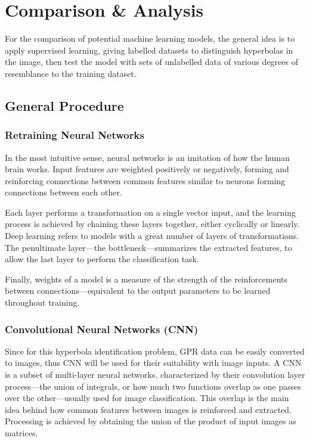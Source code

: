 \documentclass[se,blockletter]{uw-wkrpt}
\begin{document}
\section{Comparison \& Analysis}
For the comparison of potential machine learning models, the general idea is to apply supervised learning, giving labelled datasets to distinguish hyperbolas in the image, then test the model with sets of unlabelled data of various degrees of resemblance to the training dataset.

\subsection{General Procedure}
\subsubsection{Retraining Neural Networks}
In the most intuitive sense, neural networks is an imitation of how the human brain works. Input features are weighted positively or negatively, forming and reinforcing connections between common features similar to neurons forming connections between each other.

Each layer performs a transformation on a single vector input, and the learning process is achieved by chaining these layers together, either cyclically or linearly. Deep learning refers to models with a great number of layers of transformations. The penultimate layer---the bottleneck---summarizes the extracted features, to allow the last layer to perform the classification task. 

Finally, weights of a model is a measure of the strength of the reinforcements between connections---equivalent to the output parameters to be learned throughout training. 

\subsubsection{Convolutional Neural Networks (CNN)}
Since for this hyperbola identification problem, GPR data can be easily converted to images, thus CNN will be used for their suitability with image inputs. A CNN is a subset of multi-layer neural networks, characterized by their convolution layer process---the union of integrals, or how much two functions overlap as one passes over the other---usually used for image classification. This overlap is the main idea behind how common features between images is reinforced and extracted. Processing is achieved by obtaining the union of the product of input images as matrices.
\end{document}
